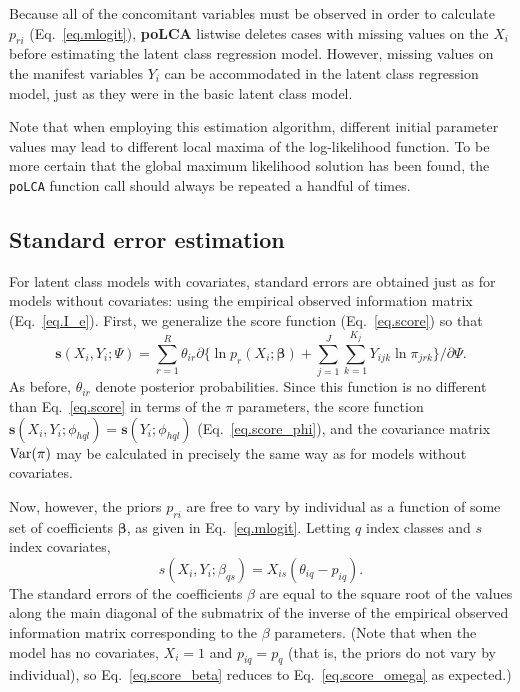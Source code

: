 \documentclass[letterpaper,12pt]{article}
\begin{document}
Because all of the concomitant variables must be observed in order to calculate $p_{ri}$ (Eq.~\ref{eq.mlogit}), \textbf{poLCA} listwise deletes cases with missing values on the $X_i$ before estimating the latent class regression model. However, missing values on the manifest variables $Y_i$ can be accommodated in the latent class regression model, just as they were in the basic latent class model.

Note that when employing this estimation algorithm, different initial parameter values may lead to different local maxima of the log-likelihood function.  To be more certain that the global maximum likelihood solution has been found, the \texttt{poLCA} function call should always be repeated a handful of times.

\subsection{Standard error estimation}

For latent class models with covariates, standard errors are obtained just as for models without covariates: using the empirical observed information matrix (Eq.~\ref{eq.I_e}).  First, we generalize the score function (Eq.~\ref{eq.score}) so that
\begin{equation}
\boldsymbol{s}(X_i,Y_i;\Psi) = \sum_{r=1}^R \theta_{ir} \partial \{
\ln p_{r}(X_i;\boldsymbol{\beta}) + \sum_{j=1}^J \sum_{k=1}^{K_j}
Y_{ijk} \ln \pi_{jrk} \} / \partial \Psi.
\end{equation}
As before, $\theta_{ir}$ denote posterior probabilities.  Since this function is no different than Eq.~\ref{eq.score} in terms of the $\pi$ parameters, the score function $\boldsymbol{s}(X_i,Y_i;\phi_{hql}) = \boldsymbol{s}(Y_i;\phi_{hql})$ (Eq.~\ref{eq.score_phi}), and the covariance matrix ${\rm Var}(\pi)$ may be calculated in precisely the same way as for models without covariates.

Now, however, the priors $p_{ri}$ are free to vary by individual as a function of some set of coefficients $\boldsymbol{\beta}$, as given in Eq.~\ref{eq.mlogit}. Letting $q$ index classes and $s$ index covariates,
\begin{equation}
s(X_i,Y_i;\beta_{qs}) = X_{is} (\theta_{iq} - p_{iq}).
\label{eq.score_beta}
\end{equation}
The standard errors of the coefficients $\beta$ are equal to the square root of the values along the main diagonal of the submatrix of the inverse of the empirical observed information matrix corresponding to the $\beta$ parameters. (Note that when the model has no covariates, $X_i=1$ and $p_{iq}=p_q$ (that is, the priors do not vary by individual), so Eq.~\ref{eq.score_beta} reduces to Eq.~\ref{eq.score_omega} as expected.)
\end{document}

